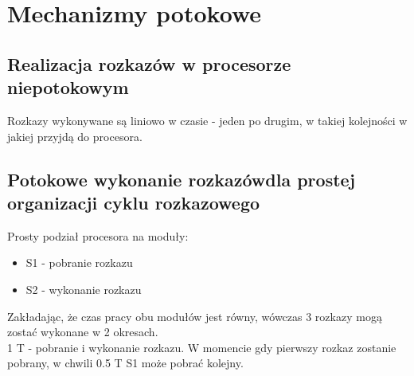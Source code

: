 	    
	\pagebreak
	\section*{Mechanizmy potokowe}
		\subsection*{Realizacja rozkazów w procesorze niepotokowym}
		Rozkazy wykonywane są liniowo w czasie - jeden po drugim, w takiej kolejności w jakiej przyjdą do procesora.
    	\subsection*{Potokowe wykonanie rozkazówdla prostej organizacji cyklu rozkazowego}
    	Prosty podział procesora na moduły:
    	\begin{itemize}
    		\item S1 - pobranie rozkazu
    		\item S2 - wykonanie rozkazu
    	\end{itemize}
    	Zakładając, że czas pracy obu modułów jest równy, wówczas 3 rozkazy mogą zostać wykonane w 2 okresach.\\
    	1 T - pobranie i wykonanie rozkazu. W momencie gdy pierwszy rozkaz zostanie pobrany, w chwili 0.5 T S1 może pobrać kolejny.
